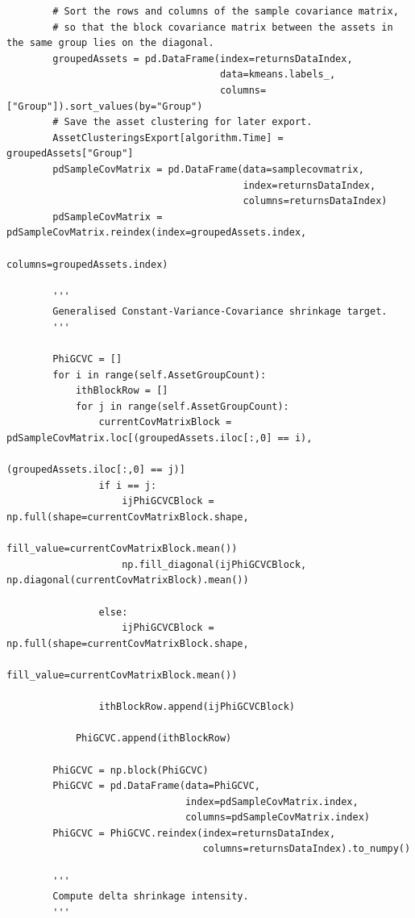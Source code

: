 \begin{verbatim}
        # Sort the rows and columns of the sample covariance matrix,
        # so that the block covariance matrix between the assets in the same group lies on the diagonal.
        groupedAssets = pd.DataFrame(index=returnsDataIndex,
                                     data=kmeans.labels_,
                                     columns=["Group"]).sort_values(by="Group")
        # Save the asset clustering for later export.
        AssetClusteringsExport[algorithm.Time] = groupedAssets["Group"]
        pdSampleCovMatrix = pd.DataFrame(data=samplecovmatrix,
                                         index=returnsDataIndex,
                                         columns=returnsDataIndex)
        pdSampleCovMatrix = pdSampleCovMatrix.reindex(index=groupedAssets.index,
                                                      columns=groupedAssets.index)
    
        '''
        Generalised Constant-Variance-Covariance shrinkage target.
        '''
    
        PhiGCVC = []
        for i in range(self.AssetGroupCount):
            ithBlockRow = []
            for j in range(self.AssetGroupCount):
                currentCovMatrixBlock = pdSampleCovMatrix.loc[(groupedAssets.iloc[:,0] == i),
                                                              (groupedAssets.iloc[:,0] == j)]
                if i == j:
                    ijPhiGCVCBlock = np.full(shape=currentCovMatrixBlock.shape,
                                             fill_value=currentCovMatrixBlock.mean())
                    np.fill_diagonal(ijPhiGCVCBlock, np.diagonal(currentCovMatrixBlock).mean())
                    
                else:
                    ijPhiGCVCBlock = np.full(shape=currentCovMatrixBlock.shape,
                                             fill_value=currentCovMatrixBlock.mean())
                
                ithBlockRow.append(ijPhiGCVCBlock)
                
            PhiGCVC.append(ithBlockRow)
            
        PhiGCVC = np.block(PhiGCVC)
        PhiGCVC = pd.DataFrame(data=PhiGCVC,
                               index=pdSampleCovMatrix.index,
                               columns=pdSampleCovMatrix.index)
        PhiGCVC = PhiGCVC.reindex(index=returnsDataIndex,
                                  columns=returnsDataIndex).to_numpy()
    
        '''
        Compute delta shrinkage intensity.
        '''
    

\end{verbatim}
